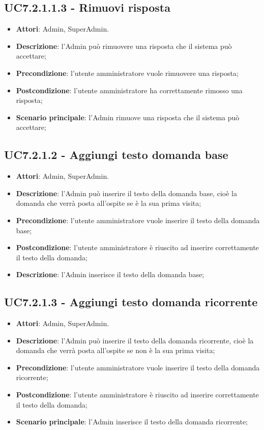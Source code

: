 \documentclass[../AnalisiDeiRequisiti_v4.0.0.tex]{subfiles}
\begin{document}
\begin{itemize}
\subsection{UC7.2.1.1.3 - Rimuovi risposta} 
\label{sssec:UC7.2.1.1.3} 
\begin{itemize} 
\item \textbf{Attori}: Admin, SuperAdmin.
\item \textbf{Descrizione}: l'Admin può rimuovere una risposta che il sistema può accettare;
\item \textbf{Precondizione}: l'utente amministratore vuole rimuovere una risposta;
\item \textbf{Postcondizione}: l'utente amministratore ha correttamente rimosso una risposta;
\item \textbf{Scenario principale}: l'Admin rimuove una risposta che il sistema può accettare;
\end{itemize}
\subsection{UC7.2.1.2 - Aggiungi testo domanda base} 
\label{sssec:UC7.2.1.2} 
\begin{itemize} 
\item \textbf{Attori}: Admin, SuperAdmin.
\item \textbf{Descrizione}: l'Admin può inserire il testo della domanda base, cioè la domanda che verrà posta all'ospite se è la sua prima visita;
\item \textbf{Precondizione}: l'utente amministratore vuole inserire il testo della domanda base;
\item \textbf{Postcondizione}: l'utente amministratore è riuscito ad inserire correttamente il testo della domanda;
\item \textbf{Descrizione}: l'Admin inserisce il testo della domanda base;
\end{itemize} 
\subsection{UC7.2.1.3 - Aggiungi testo domanda ricorrente} 
\label{sssec:UC7.2.1.3} 
\begin{itemize} 
\item \textbf{Attori}: Admin, SuperAdmin.
\item \textbf{Descrizione}: l'Admin può inserire il testo della domanda ricorrente, cioè la domanda che verrà posta all'ospite se non è la sua prima visita;
\item \textbf{Precondizione}: l'utente amministratore vuole inserire il testo della domanda ricorrente;
\item \textbf{Postcondizione}: l'utente amministratore è riuscito ad inserire correttamente il testo della domanda;
\item \textbf{Scenario principale}: l'Admin inserisce il testo della domanda ricorrente;
\end{itemize} 
\end{itemize} 
\end{document}
